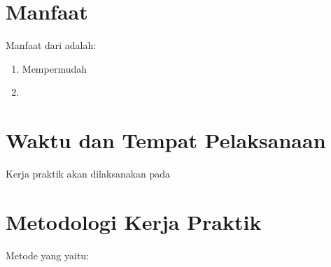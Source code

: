 \section{Manfaat}
\vspace{1ex}

Manfaat dari \lipsum[1][1] adalah:
\vspace{0.5ex}

\begin{enumerate}[nolistsep]

  \item Mempermudah \lipsum[1][1-2]
  \vspace{0.5ex}

  \item \lipsum[1][3-4]
  \vspace{0.5ex}

\end{enumerate}
\vspace{0.5ex}

\section{Waktu dan Tempat Pelaksanaan}
\vspace{1ex}

Kerja praktik akan dilaksanakan pada \lipsum[1][1-3]
\vspace{0.5ex}

\newpage

\section{Metodologi Kerja Praktik}
\vspace{1ex}

Metode yang \lipsum[1][1] yaitu:
\vspace{0.5ex}

